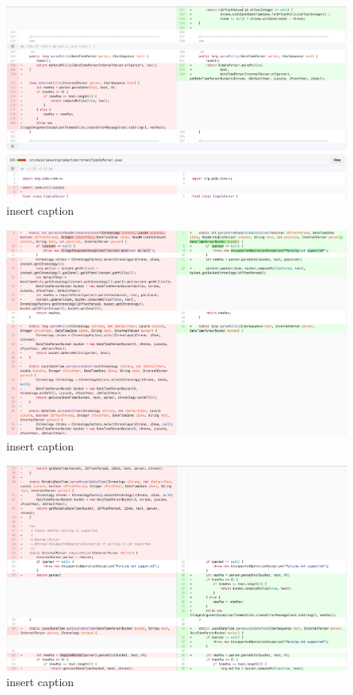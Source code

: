 \begin{figure}[H]
	\centering
	\includegraphics[width=\linewidth]{code79}
	\caption{insert caption}
\end{figure}
\begin{figure}[H]
	\centering
	\includegraphics[width=\linewidth]{code80}
	\caption{insert caption}
\end{figure}
\begin{figure}[H]
	\centering
	\includegraphics[width=\linewidth]{code81}
	\caption{insert caption}
\end{figure}
